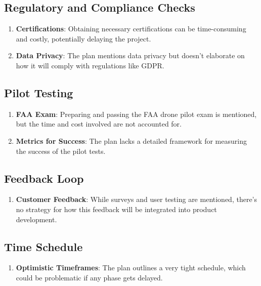 \documentclass[12pt]{article}
\begin{document}
	\subsection{Regulatory and Compliance Checks}
	\begin{enumerate}
		\item \textbf{Certifications}: Obtaining necessary certifications can be time-consuming and costly, potentially delaying the project.
		\item \textbf{Data Privacy}: The plan mentions data privacy but doesn't elaborate on how it will comply with regulations like GDPR.
	\end{enumerate}
	
	\subsection{Pilot Testing}
	\begin{enumerate}
		\item \textbf{FAA Exam}: Preparing and passing the FAA drone pilot exam is mentioned, but the time and cost involved are not accounted for.
		\item \textbf{Metrics for Success}: The plan lacks a detailed framework for measuring the success of the pilot tests.
	\end{enumerate}
	
	\subsection{Feedback Loop}
	\begin{enumerate}
		\item \textbf{Customer Feedback}: While surveys and user testing are mentioned, there's no strategy for how this feedback will be integrated into product development.
	\end{enumerate}
	
	\subsection{Time Schedule}
	\begin{enumerate}
		\item \textbf{Optimistic Timeframes}: The plan outlines a very tight schedule, which could be problematic if any phase gets delayed.
	\end{enumerate}
	
		
\end{document}
